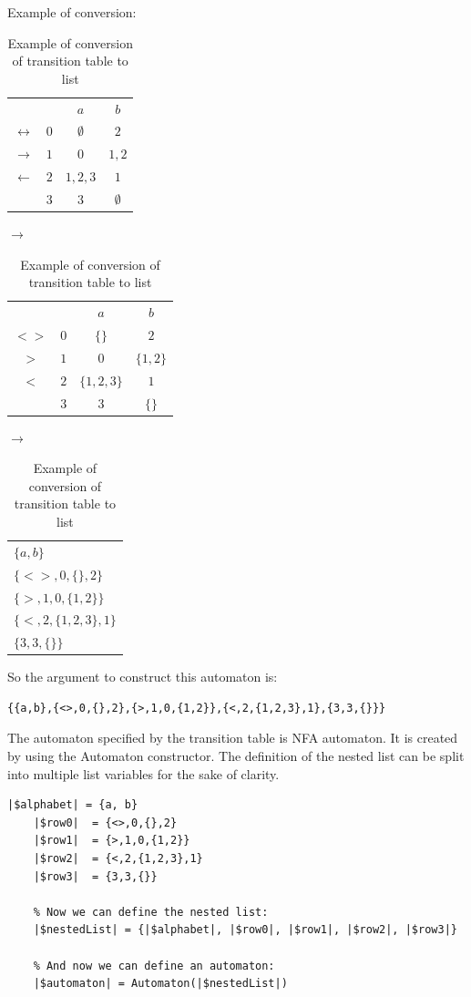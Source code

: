 \documentclass{ctuthesis}
\begin{document}
Example of conversion:
\begin{table}[H]
\begin{ctucolortab}
\begin{tabular}{cc|cc}
	&	& $a$	& $b$ \\\Midrule
$\leftrightarrow$	& $0$	& $\emptyset$	& $2$ \\
$\rightarrow$	& $1$ & $0$ & $1,2$ \\
$\leftarrow$	& $2$ & $1,2,3$ & $1$ \\
				& $3$ & $3$	& $\emptyset$ 
\end{tabular}
\quad
$\rightarrow$
\begin{tabular}{|c|c|c|c|}
\hline
	&&$a$&$b$ \\
	$<>$ & $0$ & $\{\}$ & $2$ \\
	$>$ & $1$ & $0$ & $\{1,2\}$ \\
	$<$ & $2$ & $\{1,2,3\}$ & $1$ \\
		& $3$ & $3$ & $\{\}$\\
		\hline
\end{tabular}
\quad 
$\rightarrow$
\begin{tabular}{|l|}
\hline 
$\{a, b\}$ \\
$\{<>,0,\{\}, 2\}$ \\
$\{>,1,0,\{1,2\}\}$ \\
$\{<,2,\{1,2,3\},1\}$ \\
$\{3, 3, \{\}\}$ \\\hline
\end{tabular}
\end{ctucolortab}
\caption{Example of conversion of transition table to list}
\label{fig:example_conversion}
\end{table}

So the argument to construct this automaton is:
\begin{lstlisting}[language = JASL_snippet]
	{{a,b},{<>,0,{},2},{>,1,0,{1,2}},{<,2,{1,2,3},1},{3,3,{}}}
\end{lstlisting}

The automaton specified by the transition table is NFA automaton. It is created by using the Automaton constructor. The definition of the nested list can be split into multiple list variables for the sake of clarity. 

\begin{minipage}{\linewidth}
\begin{lstlisting}[language = JASL]
	|$alphabet| = {a, b}
	|$row0|  = {<>,0,{},2}
	|$row1|  = {>,1,0,{1,2}}
	|$row2|  = {<,2,{1,2,3},1}
	|$row3|  = {3,3,{}}
	
	% Now we can define the nested list:
	|$nestedList| = {|$alphabet|, |$row0|, |$row1|, |$row2|, |$row3|}
    
	% And now we can define an automaton:
	|$automaton| = Automaton(|$nestedList|)
\end{lstlisting}
\end{minipage}
\end{document}
